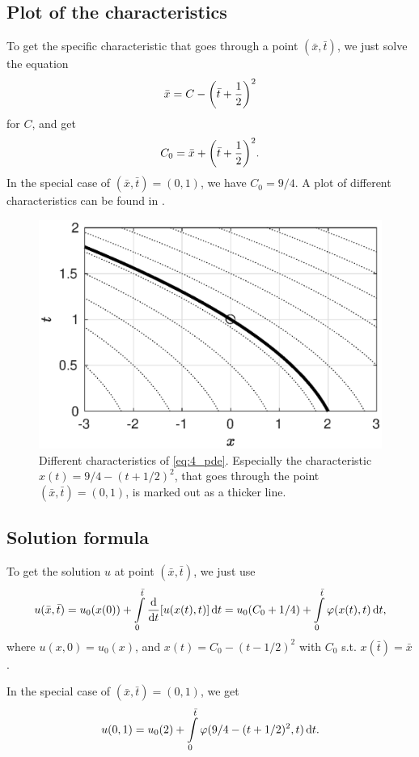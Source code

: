 \documentclass[11pt,letter, swedish, english
]{article}
\begin{document}
\subsection{Plot of the characteristics}

To get the specific characteristic that goes through a point
$(\bar{x}, \bar{t})$, we just solve the equation
\begin{equation}
\bar{x} = C - \qty(\bar{t} + \frac{1}{2})^2
\end{equation}
for $C$, and get
\begin{equation}
C_0 = \bar{x} + \qty(\bar{t} + \frac{1}{2})^2.
\end{equation}
In the special case of $(\bar{x}, \bar{t}) = (0, 1)$, we have 
$C_0 = 9/4$. A plot of different characteristics can be found in
. 

\begin{figure}
\centering
\includegraphics[width=.7\textwidth]{4b.eps}
\caption{Different characteristics of \eqref{eq:4_pde}. Especially the
  characteristic $x(t) = 9/4 -(t+1/2)^2$, that goes through the
  point $(\bar{x}, \bar{t}) = (0, 1)$, is marked out as a thicker line.} 
\label{fig:4b}
\end{figure}

\subsection{Solution formula}
To get the solution $u$ at point $(\bar{x}, \bar{t})$, we just use
\begin{equation}
u(\bar{x}, \bar{t}) 
= u_0(x(0)) + \int_{0}^{\bar{t}} \dv{t}[u(x(t), t)]\id{t}
=u_0(C_0+1/4) + \int_0^{\bar{t}} \varphi(x(t), t) \id{t},
\end{equation}
where $u(x, 0) = u_0(x)$, and $x(t) = C_0 - (t-1/2)^2$ with $C_0$
s.t. $x(\bar{t})=\bar{x}$.

In the special case of $(\bar{x}, \bar{t}) = (0, 1)$, we get
\begin{equation}
u(0, 1) = u_0(2) 
+ \int_0^{\bar{t}} \varphi(9/4-(t+1/2)^2, t) \id{t}.
\end{equation}
\end{document}
